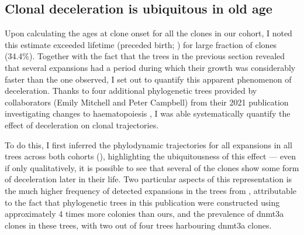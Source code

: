 \begin{figure}[!ht]
	\label{fig:trees-coefficients-ages-at-onset}
\end{figure}

\subsection{Clonal deceleration is ubiquitous in old age}

Upon calculating the ages at clone onset for all the clones in our cohort, I noted this estimate exceeded lifetime (preceded birth; ) for large fraction of clones (34.4\%). Together with the fact that the trees in the previous section revealed that several expansions had a period during which their growth was considerably faster than the one observed, I set out to quantify this apparent phenomenon of deceleration. Thanks to four additional phylogenetic trees provided by collaborators (Emily Mitchell and Peter Campbell) from their 2021 publication investigating changes to haematopoiesis \cite{Mitchell2021-zl}, I was able systematically quantify the effect of deceleration on clonal trajectories.

\begin{figure}[!ht]
	\label{fig:exceeds-within-lifetime-representation}
\end{figure}

To do this, I first inferred the phylodynamic trajectories for all expansions in all trees across both cohorts (), highlighting the ubiquitousness of this effect --- even if only qualitatively, it is possible to see that several of the clones show some form of deceleration later in their life. Two particular aspects of this representation is the much higher frequency of detected expansions in the trees from , attributable to the fact that phylogenetic trees in this publication were constructed using approximately 4 times more colonies than ours, and the prevalence of \ac{dnmt3a} clones in these trees, with two out of four trees harbouring \ac{dnmt3a} clones.

